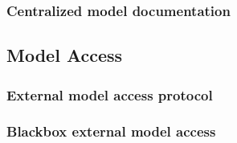 \documentclass{article}
\begin{document}
\subsubsection{Centralized model documentation}


\subsection{Model Access}
\subsubsection{External model access protocol}


\subsubsection{Blackbox external model access}

\end{document}
